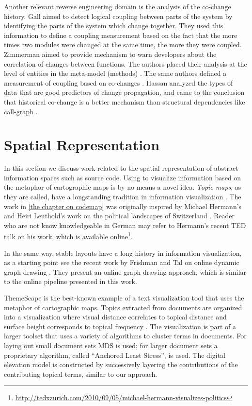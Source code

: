 Another relevant reverse engineering domain is the analysis of the co-change history.
%
Gall \etal aimed to detect logical coupling between parts of the system \cite{Gall98a} by identifying the parts of the system which change together. They used this information to define a coupling measurement based on the fact that the more times two modules were changed at the same time, the more they were coupled.
%
Zimmerman \etal aimed to provide mechanism to warn developers about the correlation of changes between functions. The authors placed their analysis at the level of entities in the meta-model (\eg methods) \cite{Zimm04a}. The same authors defined a measurement of coupling based on co-changes \cite{Zimm03a}.
%
Hassan \etal analyzed the  types of data that are good predictors of change propagation, and came to the conclusion that historical co-change is a better mechanism than structural dependencies like call-graph \cite{Hass04a}.

\section{Spatial Representation}

In this section we discuss work related to the spatial representation of abstract information spaces such as source code. Using \mds to visualize information based on the metaphor of cartographic maps is by no means a novel idea. \emph{Topic maps}, as they are called, have a longstanding tradition in information visualization \cite{Ware00a}. The work in \autoref{the chapter on codemap} was originally inspired by Michael Hermann's and Heiri Leuthold's work on the political landscapes of Switzerland \cite{Herm03a}. Reader who are not know knowledgeable in German may refer to Hermann's recent TED talk on his work, which is available online\footnote{\url{http://tedxzurich.com/2010/09/05/michael-hermann-visualizes-politics}}.

In the same way, stable layouts have a long history in information visualization, as a starting point see \eg the recent work by Frishman and Tal on online dynamic graph drawing \cite{Fris08a}. They present an online graph drawing approach, which is similar to the online pipeline presented in this work.

ThemeScape is the best-known example of a text visualization tool that uses the metaphor of cartographic maps. 
Topics extracted from documents are organized into a visualization where visual distance correlates to topical distance and surface height corresponds to topical frequency \cite{Wise95b}. The visualization is part of a larger toolset that uses a variety of algorithms to cluster terms in documents. For laying out small document sets MDS is used; for larger document sets a proprietary algorithm, called ``Anchored Least Stress'', is used. The digital elevation model is constructed by successively layering the contributions of the contributing topical terms, similar to our approach.

